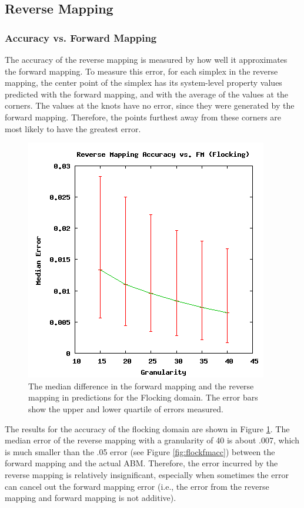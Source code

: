  \subsection{Reverse Mapping}

  \subsubsection{Accuracy vs. Forward Mapping}

The accuracy of the reverse mapping is measured by how well it approximates the forward mapping.
To measure this error, for each simplex in the reverse mapping, the center point of the simplex has its system-level property values predicted with the forward mapping, and with the average of the values at the corners.
The values at the knots have no error, since they were generated by the forward mapping.
Therefore, the points furthest away from these corners are most likely to have the greatest error.

\begin{figure}[ht]
\centering
\includegraphics[scale=.5]{images/results_flocking/rmacc.png}
\caption{The median difference in the forward mapping and the reverse mapping in predictions for the Flocking domain.
The error bars show the upper and lower quartile of errors measured.}
\label{fig:flockrmacc}
\end{figure}

The results for the accuracy of the flocking domain are shown in Figure \ref{fig:flockrmacc}.
The median error of the reverse mapping with a granularity of 40 is about .007, which is much smaller than the .05 error (see Figure \ref{fig:flockfmacc}) between the forward mapping and the actual ABM.
Therefore, the error incurred by the reverse mapping is relatively insignificant, especially when sometimes the error can cancel out the forward mapping error (i.e., the error from the reverse mapping and forward mapping is not additive).


